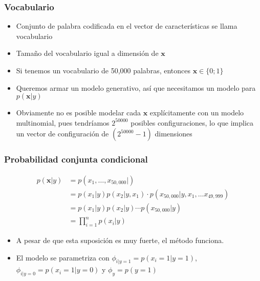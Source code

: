 \documentclass{beamer}
\begin{document}
\begin{frame}
\frametitle{Vocabulario}


\begin{itemize}
\item Conjunto de palabra codificada en el vector de características se llama vocabulario
\item Tamaño del vocabulario igual a dimensión de $\boldsymbol{x}$
\item Si tenemos un vocabulario de 50,000 palabras, entonces $\boldsymbol{x} \in \lbrace 0; 1\rbrace$
\item Queremos armar un modelo generativo, así que necesitamos un modelo para $p(\boldsymbol{x}\vert y)$
\item Obviamente no es posible modelar cada $\boldsymbol{x}$ explícitamente con un modelo multinomial, pues tendríamos $2^{50000}$ posibles configuraciones, lo que implica un vector de configuración de $(2^{50000} -1)$ dimensiones  

\end{itemize}
\end{frame}
\begin{frame}
\frametitle{Probabilidad conjunta condicional}
\begin{equation*}
\begin{split}
p(\boldsymbol{x} \vert y)&= p(x_{1}, \ldots, x_{50,000} \vert)\\
&=  p(x_{1} \vert y) p(x_{2} \vert y, x_{1}) \cdot p(x_{50,000} \vert y, x_{1}, \ldots x_{49,999})\\
&= p(x_{1} \vert y) p(x_{2} \vert y )\cdots  p(x_{50,000} \vert y )\\
&= \prod_{i=1}^{n} p(x_i\vert y)
\end{split}
\end{equation*}

\begin{itemize}
\item A pesar de que esta suposición es muy fuerte, el método funciona. 
\item El modelo se parametriza con $\phi_{i\vert y=1}=p(x_{i}=1\vert y=1 )$, $ \phi_{i\vert y=0}=p(x_{i}=1\vert y=0 )$ y $ \phi_{y}=p(y=1 )$

\end{itemize}


\end{frame}
%
\end{document}
